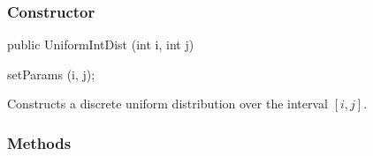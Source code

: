 \subsubsection* {Constructor}

\begin{code}

   public UniformIntDist (int i, int j)\begin{hide} {
      setParams (i, j);
   }\end{hide}
\end{code}
  \begin{tabb} Constructs a discrete uniform distribution over the interval $[i,j]$.
  \end{tabb}


\subsubsection* {Methods}


